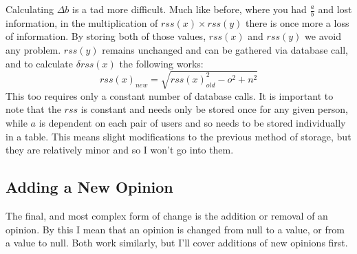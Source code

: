 \documentclass[12pt]{article}
\begin{document}
  \p Calculating $\Delta b$ is a tad more difficult.  Much like before, where you had $\frac{a}{b}$ and lost information, in the multiplication of $rss(x)\times rss(y)$ there is once more a loss of information.  By storing both of those values, $rss(x)$ and $rss(y)$ we avoid any problem.  $rss(y)$ remains unchanged and can be gathered via database call, and to calculate $\delta rss(x)$ the following works:
  \begin{displaymath}
    rss(x)_{new} = \sqrt{rss(x)_{old}^2 - o^2 + n^2}
  \end{displaymath}
  \p This too requires only a constant number of database calls.  It is important to note that the $rss$ is constant and needs only be stored once for any given person, while $a$ is dependent on each pair of users and so needs to be stored individually in a table.  This means slight modifications to the previous method of storage, but they are relatively minor and so I won't go into them.  

  \subsection{Adding a New Opinion}
  \indent\indent The final, and most complex form of change is the addition or removal of an opinion.  By this I mean that an opinion is changed from null to a value, or from a value to null.  Both work similarly, but I'll cover additions of new opinions first.  
 
\end{document}
